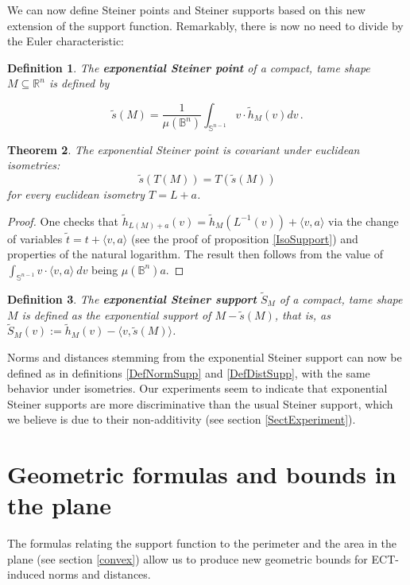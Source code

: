 \documentclass[a4paper]{article}
\newtheorem{theorem}{Theorem}[section]
\newtheorem{definition}[theorem]{Definition}
\newcommand{\bb}{\mathbb}
\begin{document}
We can now define Steiner points and Steiner supports based on this new extension of the support function. Remarkably, there is now no need to divide by the Euler characteristic:

\begin{definition}
	The \textbf{exponential Steiner point} of a compact, tame shape $M\subseteq \bb R^n$ is defined by
	
	\[ \tilde s(M)=\frac{1}{\mu(\bb B^n)} \int_{\bb S^{n-1}} v \cdot \tilde h_M(v) dv \, .\]
\end{definition}

\begin{theorem}
	The exponential Steiner point is covariant under euclidean isometries:
	\[ \tilde s(T(M))=T(\tilde s(M)) \]
	for every euclidean isometry $T=L+a$.
\end{theorem}

\begin{proof}
	One checks that $\tilde h_{L(M)+a}(v)=\tilde h_{M}(L^{-1}(v))+\langle v,a \rangle$ via the change of variables $\tilde t = t + \langle v,a \rangle$ (see the proof of proposition \ref{IsoSupport}) and properties of the natural logarithm. The result then follows from the value of $\int_{\bb S^{n-1}} v \cdot \langle v,a \rangle \: dv$ being $\mu (\bb B^n) a$.
\end{proof}


\begin{definition}
	\label{DefExpSupp}
	The \textbf{exponential Steiner support} $\tilde S_M$ of a compact, tame shape $M$ is defined as the exponential support of $M-\tilde s(M)$, that is, as $\tilde S_M(v):=\tilde h_M(v) -\langle v,\tilde s(M) \rangle$.
\end{definition}

Norms and distances stemming from the exponential Steiner support can now be defined as in definitions \ref{DefNormSupp} and \ref{DefDistSupp}, with the same behavior under isometries. Our experiments seem to indicate that exponential Steiner supports are more discriminative than the usual Steiner support, which we believe is due to their non-additivity (see section \ref{SectExperiment}).
	
\section{Geometric formulas and bounds in the plane}
\label{SectGeo}
The formulas relating the support function to the perimeter and the area in the plane (see section \ref{convex}) allow us to produce new geometric bounds for ECT-induced norms and distances.
\end{document}
